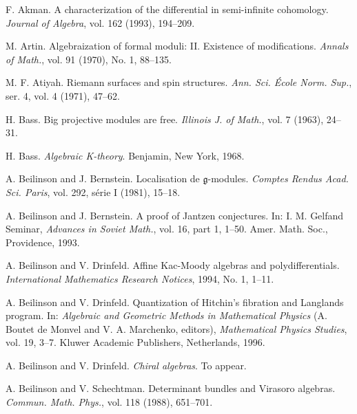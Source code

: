 \frenchspacing
\begin{description}[leftmargin=3.2em,itemsep=2pt]
\item[{[Ak]}] F. Akman. A characterization of the differential in semi-infinite cohomology. \emph{Journal of Algebra}, vol. 162 (1993), 194--209.
\item[{[Ar]}] M. Artin. Algebraization of formal moduli: II. Existence of modifications. \emph{Annals of Math.}, vol. 91 (1970), No. 1, 88--135.
\item[{[At]}] M. F. Atiyah. Riemann surfaces and spin structures. \emph{Ann. Sci. École Norm. Sup.}, ser. 4, vol. 4 (1971), 47--62.
\item[{[Ba63]}] H. Bass. Big projective modules are free. \emph{Illinois J. of Math.}, vol. 7 (1963), 24--31.
\item[{[Ba68]}] H. Bass. \emph{Algebraic K-theory}. Benjamin, New York, 1968.
\item[{[BB81]}] A. Beilinson and J. Bernstein. Localisation de $\mathfrak{g}$-modules. \emph{Comptes Rendus Acad. Sci. Paris}, vol. 292, série I (1981), 15--18.
\item[{[BB93]}] A. Beilinson and J. Bernstein. A proof of Jantzen conjectures. In: I. M. Gelfand Seminar, \emph{Advances in Soviet Math.}, vol. 16, part 1, 1--50. Amer. Math. Soc., Providence, 1993.
\item[{[BD94]}] A. Beilinson and V. Drinfeld. Affine Kac-Moody algebras and polydifferentials. \emph{International Mathematics Research Notices}, 1994, No. 1, 1--11.
\item[{[BD96]}] A. Beilinson and V. Drinfeld. Quantization of Hitchin's fibration and Langlands program. In: \emph{Algebraic and Geometric Methods in Mathematical Physics} (A. Boutet de Monvel and V. A. Marchenko, editors), \emph{Mathematical Physics Studies}, vol. 19, 3--7. Kluwer Academic Publishers, Netherlands, 1996.
\item[{[BD]}] A. Beilinson and V. Drinfeld. \emph{Chiral algebras}. To appear.
\item[{[BS]}] A. Beilinson and V. Schechtman. Determinant bundles and Virasoro algebras. \emph{Commun. Math. Phys.}, vol. 118 (1988), 651--701.

\end{description}
